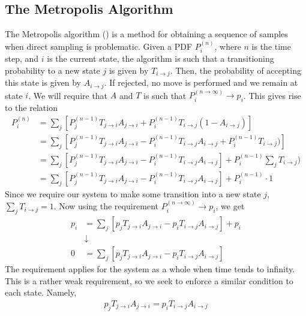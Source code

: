 \documentclass[11pt]{article}
\begin{document}
\subsection{The Metropolis Algorithm}
The Metropolis algorithm (\cite{metropolis}\cite{metropolis_hastings}) is a method for obtaining a sequence of samples when direct sampling is problematic. Given a PDF $P^{(n)}_i$, where $n$ is the time step, and $i$ is the current state, the algorithm is such that a transitioning probability to a new state $j$ is given by $T_{i\rightarrow j}$. Then, the probability of accepting this state is given by $A_{i\rightarrow j}$. If rejected, no move is performed and we remain at state $i$. We will require that $A$ and $T$ is such that $P^{(n\rightarrow \infty)}_i\rightarrow p_i$. This gives rise to the relation
\begin{align*}
	P^{(n)}_i &= \sum_j \left[ P^{(n-1)}_j T_{j\rightarrow i} A_{j\rightarrow i} + P^{(n-1)}_i T_{i\rightarrow j} (1 - A_{i\rightarrow j}) \right] \\
	&= \sum_j \left[ P^{(n-1)}_j T_{j\rightarrow i} A_{j\rightarrow i} - P^{(n-1)}_i T_{i\rightarrow j} A_{i\rightarrow j} + P^{(n-1)}_i T_{i\rightarrow j}) \right] \\
	&= \sum_j \left[ P^{(n-1)}_j T_{j\rightarrow i} A_{j\rightarrow i} - P^{(n-1)}_i T_{i\rightarrow j} A_{i\rightarrow j} \right] + P^{(n-1)}_i \sum_j T_{i\rightarrow j}) \\
	&= \sum_j \left[ P^{(n-1)}_j T_{j\rightarrow i} A_{j\rightarrow i} - P^{(n-1)}_i T_{i\rightarrow j} A_{i\rightarrow j} \right] + P^{(n-1)}_i \cdot 1
\end{align*}
Since we require our system to make some transition into a new state $j$, $\sum_j T_{i\rightarrow j} = 1$. Now using the requirement $P^{(n\rightarrow \infty)}_i\rightarrow p_i$, we get 
\begin{align*}
	p_i &= \sum_j \left[ p_j T_{j\rightarrow i} A_{j\rightarrow i} - p_i T_{i\rightarrow j} A_{i\rightarrow j} \right] + p_i \\
	&\downarrow \\
	0 &= \sum_j \left[p_j T_{j\rightarrow i} A_{j\rightarrow i} - p_i T_{i\rightarrow j} A_{i\rightarrow j} \right]
\end{align*}
The requirement applies for the system as a whole when time tends to infinity. This is a rather weak requirement, so we seek to enforce a similar condition to each state. Namely,
\begin{align*}
	p_j T_{j\rightarrow i} A_{j\rightarrow i} = p_i T_{i\rightarrow j} A_{i\rightarrow j}
\end{align*}
\end{document}
